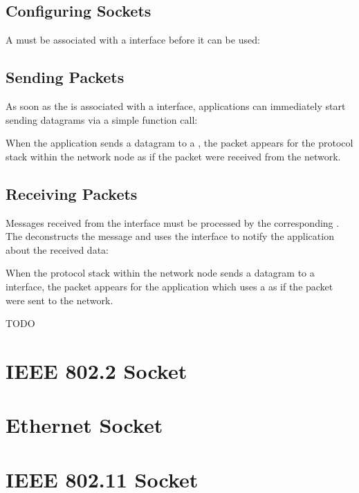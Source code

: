 \subsection*{Configuring Sockets}

A  must be associated with a  interface before
it can be used:


\subsection*{Sending Packets}

As soon as the  is associated with a 
interface, applications can immediately start sending datagrams via a simple
function call:


When the application sends a datagram to a , the packet
appears for the protocol stack within the network node as if the packet were
received from the network.

\subsection*{Receiving Packets}

Messages received from the  interface must be processed by the
corresponding . The  deconstructs the
message and uses the  interface to notify the
application about the received data:


When the protocol stack within the network node sends a datagram to a
 interface, the packet appears for the application which uses a
 as if the packet were sent to the network.



\ifdraft TODO
\section{IEEE 802.2 Socket}

\section{Ethernet Socket}

\section{IEEE 802.11 Socket}
\fi
